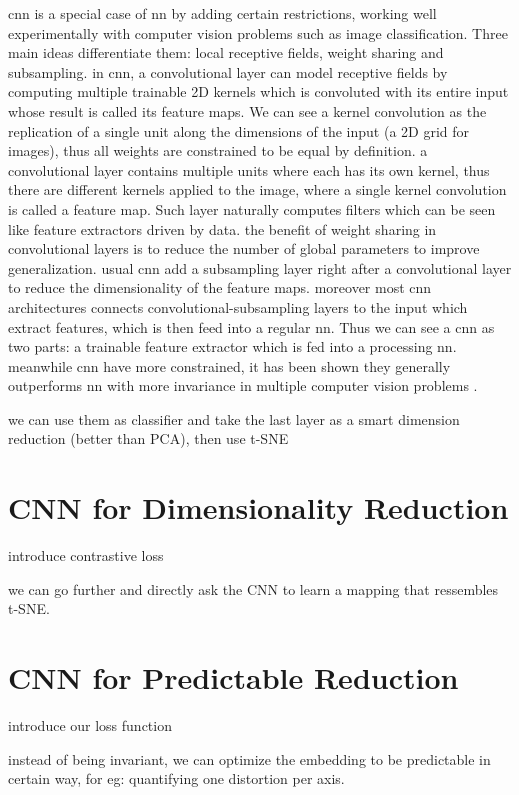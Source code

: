 \documentclass[a4paper,12pt]{report}
\begin{document}
cnn is a special case of nn by adding certain restrictions, working well experimentally with computer vision problems such as image classification.
Three main ideas differentiate them: local receptive fields, weight sharing and subsampling.
in cnn, a convolutional layer can model receptive fields by computing multiple trainable 2D kernels which is convoluted with its entire input whose result is called its feature maps.
We can see a kernel convolution as the replication of a single unit along the dimensions of the input (a 2D grid for images), thus all weights are constrained to be equal by definition.
a convolutional layer contains multiple units where each has its own kernel, thus there are different kernels applied to the image, where a single kernel convolution is called a feature map.
Such layer naturally computes filters which can be seen like feature extractors driven by data.
the benefit of weight sharing in convolutional layers is to reduce the number of global parameters to improve generalization.
usual cnn add a subsampling layer right after a convolutional layer to reduce the dimensionality of the feature maps.
moreover most cnn architectures connects convolutional-subsampling layers to the input which extract features, which is then feed into a regular nn.
Thus we can see a cnn as two parts: a trainable feature extractor which is fed into a processing nn.
meanwhile cnn have more constrained, it has been shown they generally outperforms nn with more invariance in multiple computer vision problems \cite{simard2003best}\cite{mnist_web}\cite{lawrence1997face}\cite{krizhevsky2012imagenet}.

we can use them as classifier and take the last layer as a smart dimension reduction (better than PCA), then use t-SNE

\section{CNN for Dimensionality Reduction}
introduce contrastive loss

we can go further and directly ask the CNN to learn a mapping that ressembles t-SNE.

\section{CNN for Predictable Reduction}
introduce our loss function

instead of being invariant, we can optimize the embedding to be predictable in certain way, for eg: quantifying one distortion per axis.
\end{document}
